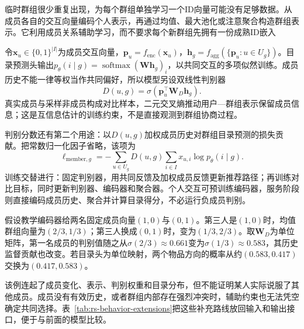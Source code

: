 临时群组很少重复出现，为每个群组单独学习一个ID向量可能没有足够数据。从成员各自的交互向量编码个人表示，再通过均值、最大池化或注意聚合构造群组表示。它利用成员关系辅助学习，而不要求每个新群组先拥有一份成熟ID嵌入

令$\bm{x}_u\in\{0,1\}^{|I|}$为成员交互向量，$\bm{p}_u=f_{\mathrm{enc}}(\bm{x}_u)$，$\bm{h}_g=f_{\mathrm{agg}}(\{\bm{p}_u:u\in U_g\})$。目录预测头输出$p_\theta(i\mid g)=\operatorname{softmax}(\bm{W}\bm{h}_g)_i$，以共同交互的多项似然训练。成员历史不能一律等权当作共同偏好，所以模型另设双线性判别器
\begin{equation}
  D(u,g)=\sigma(\bm{p}_u^\top\bm{W}_{D}\bm{h}_g).
  \label{eq:rs-groupim-discriminator}
\end{equation}
真实成员与采样非成员构成对比样本，二元交叉熵推动用户—群组表示保留成员信息；这是互信息估计的训练约束，不是直接观测到群组协商过程。

判别分数还有第二个用途：以$D(u,g)$加权成员历史对群组目录预测的损失贡献。把常数归一化因子省略，该项为
\[
  \ell_{\mathrm{member},g}
    =-\sum_{u\in U_g}D(u,g)\sum_{i\in I}x_{u,i}\log p_\theta(i\mid g).
\]
训练交替进行：固定判别器，用共同反馈及加权成员反馈更新推荐路径；再训练对比目标，同时更新判别器、编码器和聚合器。个人交互可预训练编码器，服务阶段则直接编码成员历史、聚合并计算目录得分，不必运行负成员判别。

假设教学编码器给两名固定成员向量$(1,0)$与$(0,1)$。第三人是$(1,0)$时，均值群组向量为$(2/3,1/3)$；第三人换成$(0,1)$时，变为$(1/3,2/3)$。取$\bm{W}_D$为单位矩阵，第一名成员的判别值随之从$\sigma(2/3)\approx0.661$变为$\sigma(1/3)\approx0.583$，其历史监督贡献也改变。若目录头为单位映射，两个物品方向的概率从约$(0.583,0.417)$交换为$(0.417,0.583)$。

该例连起了成员变化、表示、判别权重和目录分布，但不能证明某人实际说服了其他成员。成员没有有效历史，或者群组内部存在强烈冲突时，辅助约束也无法凭空确定共同选择。表~\ref{tab:rs-behavior-extensions}把这些补充路线放回输入和输出接口，便于与前面的模型比较。

